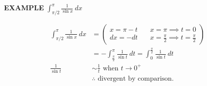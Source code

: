 \documentclass{article}
\begin{document}
\vspace{10pt}

{\bf{}EXAMPLE} $\int_{\pi/2}^\pi\frac{1}{\sin x}\ dx$

\begin{align*}
\int_{\pi/2}^\pi\frac{1}{\sin x}\ dx&=\left(\begin{aligned}x=\pi-t&\quad x=\pi\implies t=0\\dx=-dt&\quad x=\frac{\pi}{2}\implies t=\frac{\pi}{2}\end{aligned}\right)\\
&=-\int_\frac{\pi}{2}^\pi\frac{1}{\sin t}\ dt=\int_0^\frac{\pi}{2}\frac{1}{\sin t}\ dt\\
\frac{1}{\sin t}&\sim\frac{1}{t}\mbox{ when }t\to0^+\\
&\therefore\mbox{ divergent by comparison.}
\end{align*}
\end{document}
